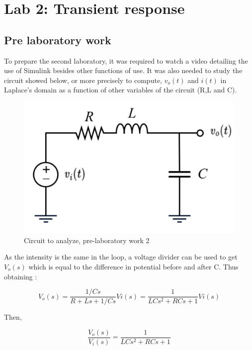 \documentclass[a4paper,12pt]{article}
\begin{document}
\newpage


\section{Lab 2: Transient response}


\vspace{1cm}

\subsection{Pre laboratory work}
\vspace{0.5cm}

To prepare the second laboratory, it was required to watch a video detailing the use of Simulink besides other functions of use. It was also needed to study the circuit showed below, or more precisely to compute, $v_o(t)$ and $i(t)$ in Laplace's domain as a function of other variables of the circuit (R,L and C).

\vspace{0.5cm}

\begin{figure}[H]
    \centering
    \includegraphics[width=0.5\linewidth]{fonts_lab_2/circuit_lab_2.png}
    \caption{Circuit to analyze, pre-laboratory work 2}
    \label{fig:enter-label}
\end{figure}

\vspace{0.5cm}

As the intensity is the same in the loop, a voltage divider can be used to get $V_o(s)$ which is equal to the difference in potential before and after C. Thus obtaining :

\[V_o(s)= \frac{1/Cs}{R+Ls+1/Cs}Vi(s)= \frac{1}{LCs^2+RCs+1 }Vi(s)\]

Then, 

\begin{equation} 
\frac{V_o(s)}{V_i(s)}=\frac{1}{LCs^2+RCs+1 }
\end{equation}

\vspace{0.5cm}
\end{document}
